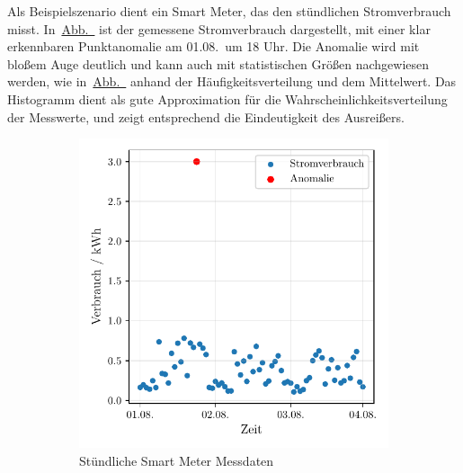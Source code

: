 Als Beispielszenario dient ein Smart Meter, das den stündlichen Stromverbrauch misst.
In~\hyperref[subfig:smartmeter]{Abb.~} ist der gemessene Stromverbrauch dargestellt, mit einer klar
erkennbaren Punktanomalie am 01.08.~um 18 Uhr. Die Anomalie wird mit bloßem Auge deutlich und kann auch mit statistischen Größen
nachgewiesen werden, wie in~\hyperref[subfig:smartmeter_histogramm]{Abb.~} anhand der
Häufigkeitsverteilung und dem Mittelwert. Das Histogramm dient als gute Approximation für die
Wahrscheinlichkeitsverteilung der Messwerte, und zeigt entsprechend die Eindeutigkeit des Ausreißers.

\begin{figure}[H]
    \centering
    \begin{subfigure}[b]{0.49\linewidth}
        \includegraphics[width=\linewidth]{ch4_anomalien/abbildungen/punktanomalie_bsp.pdf}
        \caption{Stündliche Smart Meter Messdaten}\label{subfig:smartmeter}
    \end{subfigure}
    \begin{subfigure}[b]{0.49\linewidth}

\end{subfigure}
\end{figure}
